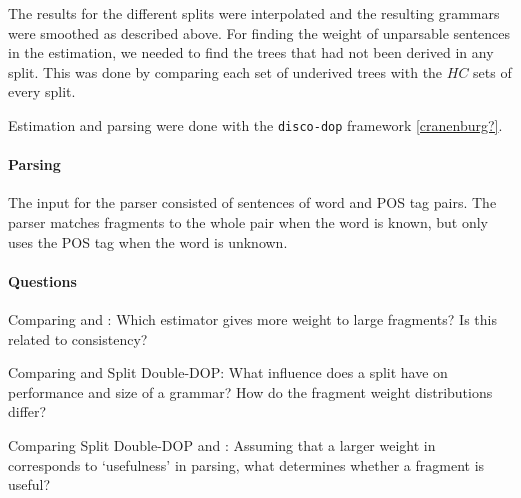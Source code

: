 The results for the different splits were interpolated and the resulting grammars were smoothed as described above. For finding the weight of unparsable sentences in the \dops{} estimation, we needed to find the trees that had not been derived in any split. This was done by comparing each set of underived trees with the $HC$ sets of every split.

Estimation and parsing were done with the \texttt{disco-dop} framework \ref{cranenburg?}.

\paragraph{Parsing}
The input for the parser consisted of sentences of word and POS tag pairs. The parser matches fragments to the whole pair when the word is known, but only uses the POS tag when the word is unknown.



\paragraph{Questions}
Comparing \dops{} and \ddop{}: Which estimator gives more weight to large fragments? Is this related to consistency?

Comparing \ddop{} and Split Double-DOP: What influence does a split have on performance and size of a grammar? How do the fragment weight distributions differ?

Comparing Split Double-DOP and \dops{}: Assuming that a larger weight in \dops{} corresponds to `usefulness' in parsing, what determines whether a fragment is useful?



